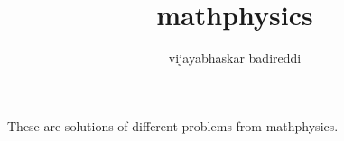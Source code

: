 \documentclass[12pt]{article}
\title{mathphysics}
\author{vijayabhaskar badireddi}
\begin{document}
These are solutions of different problems from mathphysics.

\end{document}
